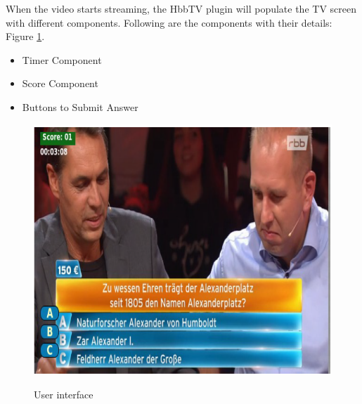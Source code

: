 When the video starts streaming, the HbbTV plugin will
populate the TV screen with different components. Following
are the components with their details: Figure \ref{fig:User-interface}.


    
    \begin{itemize}
       \item Timer Component
\item Score Component
\item Buttons to Submit Answer
    \end{itemize}




\begin{figure}[!ht]
	\centering
\includegraphics[scale=0.6]{figures/User-interface.png}\\
	\caption{User interface}
	\label{fig:User-interface}
\end{figure}




